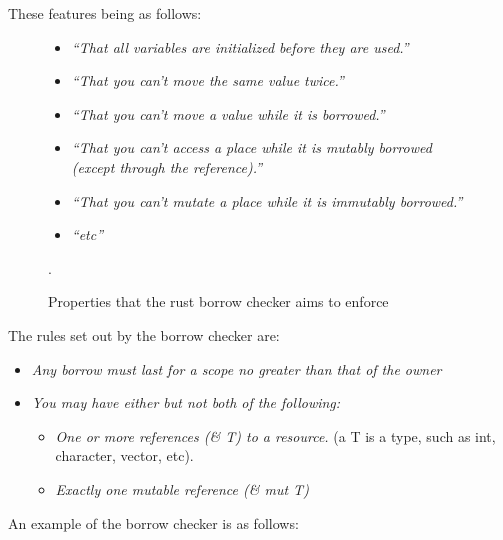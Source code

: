 \documentclass[a4paper]{article}
\begin{document}
These features being as follows:
\begin{figure}[H]\label{figure:borrow-checker-properties}
\begin{itemize}
    \item{\emph{``That all variables are initialized before they are used.''}}
    \item{\emph{``That you can't move the same value twice.''}}
    \item{\emph{``That you can't move a value while it is borrowed.''}}
    \item{\emph{``That you can't access a place while it is mutably borrowed (except through the reference).''}}
    \item{\emph{``That you can't mutate a place while it is immutably borrowed.''}}
    \item{\emph{``etc''}}
\end{itemize}
\caption{Properties that the rust borrow checker aims to enforce \parencite{borrow-checker-properties}}.
\end{figure}

The rules set out by the borrow checker are:
\begin{itemize}\label{rust:borrow-checker-rules}
    \item{\emph{Any borrow must last for a scope no greater than that of the owner}}
	\item \emph{You may have either but not both of the following:}
	      \begin{itemize}
              \item{\emph{One or more references (\& T) to a resource.} (a T is a type, such as int, character, vector, etc).}
		      \item \emph{Exactly one mutable reference (\& mut T)}
	      \end{itemize}
          \parencite{rust-book}
\end{itemize}

An example of the borrow checker is as follows:
\end{document}
